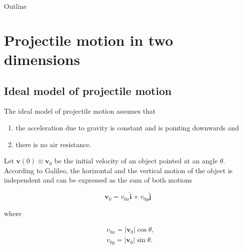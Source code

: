





\maketitle

\begin{frame}{Outline}
\tableofcontents[hideallsubsections]
\end{frame}

\section[Introduction]{Projectile motion in two dimensions}

\subsection{Ideal model of projectile motion}

\begin{frame}{\subsecname}


The ideal model of projectile motion assumes that 

\begin{enumerate}
\item the acceleration due to gravity is constant and is pointing downwards and 
\item there is no air resistance.
\end{enumerate}

\end{frame}

\begin{frame}{\subsecname}

Let \(\mathbf{v}(0) \equiv \mathbf{v}_0\) be the initial velocity of an object pointed at an angle \(\theta\). According to Galileo, the horizontal and the vertical motion of the object is independent and can be expressed as the sum of both motions
 
\begin{equation}\mathbf{v}_0 = v_{0x}\hat{\mathbf{i}} + v_{0y}\hat{\mathbf{j}}\end{equation}

where

\begin{align}
&v_{0x} = |\mathbf{v}_0| \cos \theta, \\ 
&v_{0y} = |\mathbf{v}_0| \sin \theta.
\end{align}
\end{frame}

